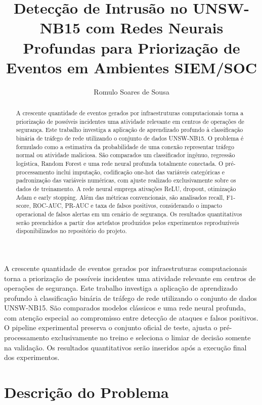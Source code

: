 \documentclass[12pt]{article}
\title{Detecção de Intrusão no UNSW-NB15 com Redes Neurais Profundas para Priorização de Eventos em Ambientes SIEM/SOC}
\author{Romulo Soares de Sousa}
\begin{document}
\maketitle

\begin{abstract}
A crescente quantidade de eventos gerados por infraestruturas computacionais torna a priorização de possíveis incidentes uma atividade relevante em centros de operações de segurança. Este trabalho investiga a aplicação de aprendizado profundo à classificação binária de tráfego de rede utilizando o conjunto de dados UNSW-NB15. O problema é formulado como a estimativa da probabilidade de uma conexão representar tráfego normal ou atividade maliciosa. São comparados um classificador ingênuo, regressão logística, Random Forest e uma rede neural profunda totalmente conectada. O pré-processamento inclui imputação, codificação one-hot das variáveis categóricas e padronização das variáveis numéricas, com ajuste realizado exclusivamente sobre os dados de treinamento. A rede neural emprega ativações ReLU, dropout, otimização Adam e early stopping. Além das métricas convencionais, são analisados recall, F1-score, ROC-AUC, PR-AUC e taxa de falsos positivos, considerando o impacto operacional de falsos alertas em um cenário de segurança. Os resultados quantitativos serão preenchidos a partir dos artefatos produzidos pelos experimentos reproduzíveis disponibilizados no repositório do projeto.
\end{abstract}

\begin{resumo}
A crescente quantidade de eventos gerados por infraestruturas computacionais torna a priorização de possíveis incidentes uma atividade relevante em centros de operações de segurança. Este trabalho investiga a aplicação de aprendizado profundo à classificação binária de tráfego de rede utilizando o conjunto de dados UNSW-NB15. São comparados modelos clássicos e uma rede neural profunda, com atenção especial ao compromisso entre detecção de ataques e falsos positivos. O pipeline experimental preserva o conjunto oficial de teste, ajusta o pré-processamento exclusivamente no treino e seleciona o limiar de decisão somente na validação. Os resultados quantitativos serão inseridos após a execução final dos experimentos.
\end{resumo}

\section{Descrição do Problema}
\label{sec:problema}
\end{document}
